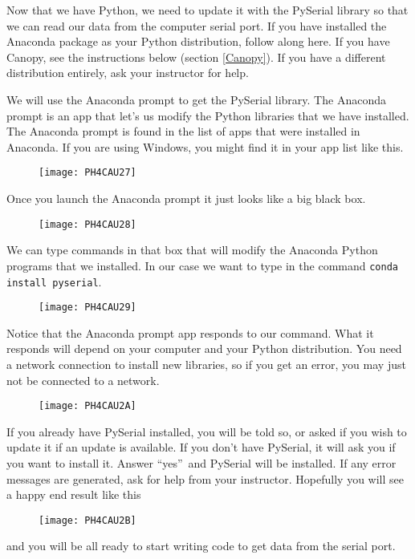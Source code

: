 Now that we have Python, we need to update it with the PySerial library so
that we can read our data from the computer serial port. If you have
installed the Anaconda package as your Python distribution, follow along
here. If you have Canopy, see the instructions below (section \ref{Canopy}).
If you have a different distribution entirely, ask your instructor for help.

We will use the Anaconda prompt to get the PySerial library. The Anaconda
prompt is an app that let's us modify the Python libraries that we have
installed. The Anaconda prompt is found in the list of apps that were
installed in Anaconda. If you are using Windows, you might find it in your
app list like this.

\begin{figure}[h!]
\texttt{[image: PH4CAU27]}
\end{figure}

Once you launch the Anaconda prompt it just looks like a big black box. 
\begin{figure}[h!]
\texttt{[image: PH4CAU28]}
\end{figure}We can type commands in that box
that will modify the Anaconda Python programs that we installed. In our case
we want to type in the command \texttt{conda install pyserial}.

\begin{figure}[h!]
\texttt{[image: PH4CAU29]}
\end{figure}

Notice that the Anaconda prompt app responds to our command. What it
responds will depend on your computer and your Python distribution. You need
a network connection to install new libraries, so if you get an error, you
may just not be connected to a network.

\begin{figure}[h!]
\texttt{[image: PH4CAU2A]}
\end{figure}If you already have PySerial
installed, you will be told so, or asked if you wish to update it if an
update is available. If you don't have PySerial, it will ask you if you want
to install it. Answer \textquotedblleft yes\textquotedblright\ and PySerial
will be installed. If any error messages are generated, ask for help from
your instructor. Hopefully you will see a happy end result like this 
\begin{figure}[h!]
\texttt{[image: PH4CAU2B]}
\end{figure}%
and you will be all ready to start writing code to get data from the serial
port.

